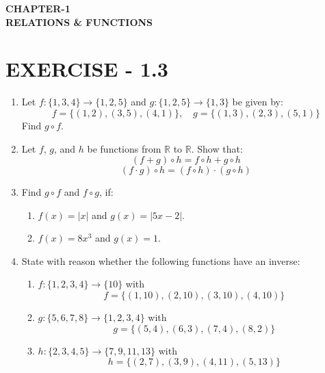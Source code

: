 \documentclass[12pt]{article}
\begin{document}
\begin{center}                                                     \textbf{\Large{CHAPTER-1 \\ RELATIONS \& FUNCTIONS}}
\end{center}
\section*{\centering EXERCISE - 1.3}                               \begin{enumerate}
\item Let $ f : \{1, 3, 4\} \to \{1, 2, 5\} $ and $ g : \{1, 2, 5\} \to \{1, 3\} $ be given by:
\[f = \{(1, 2), (3, 5), (4, 1)\}, \quad g = \{(1, 3), (2, 3), (5, 1)\}\]
Find $ g \circ f $.
\item Let $ f $, $ g $, and $ h $ be functions from $ \mathbb{R} $ to $ \mathbb{R} $. Show that:
\[(f + g) \circ h = f \circ h + g \circ h\]                        \[(f \cdot g) \circ h = (f \circ h) \cdot (g \circ h)\]
\item Find $ g \circ f $ and $ f \circ g $, if:
\begin{enumerate}
\item $ f(x) = |x| $ and $ g(x) = |5x - 2| $.
\item $ f(x) = 8x^3 $ and $ g(x) = 1 $.
\end{enumerate}
\item State with reason whether the following functions have an inverse:
\begin{enumerate}
\item $ f : \{1, 2, 3, 4\} \to \{10\} $ with
\[f = \{(1, 10), (2, 10), (3, 10), (4, 10)\}
\]
\item $ g : \{5, 6, 7, 8\} \to \{1, 2, 3, 4\} $ with
\[g = \{(5, 4), (6, 3), (7, 4), (8, 2)\}
\]
\item $ h : \{2, 3, 4, 5\} \to \{7, 9, 11, 13\} $ with
\[h = \{(2, 7), (3, 9), (4, 11), (5, 13)\}
\]
\end{enumerate}
\end{enumerate}
\end{document}
